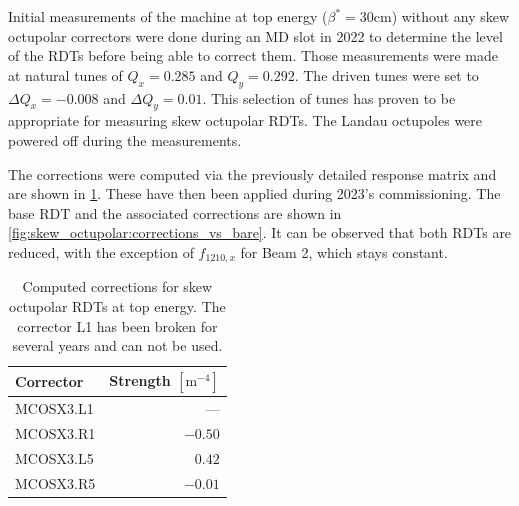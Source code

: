 
Initial measurements of the machine at top energy ($\beta^*=30$cm) without any skew octupolar
correctors were done during an MD slot in 2022 to determine the level of the RDTs before being able
to correct them. Those measurements were made at natural tunes of $Q_x = 0.285$ and $Q_y = 0.292$.
The driven tunes were set to $\Delta Q_x = -0.008$ and $\Delta Q_y = 0.01$. This selection of tunes
has proven to be appropriate for measuring skew octupolar RDTs. The Landau octupoles were powered
off during the measurements. 

The corrections were computed via the previously detailed response matrix and are shown in
\cref{tab:skew_octupolar:correction_strengths}. These have then been applied during 2023's
commissioning. The base RDT and the associated corrections are shown in
\cref{fig:skew_octupolar:corrections_vs_bare}. It can be observed that both RDTs are reduced, with
the exception of $f_{1210,x}$ for Beam 2, which stays constant.


\begin{table}[!htb]
    \centering
    \begin{tabular}{lr}
      \toprule
      Corrector    &    Strength $[\text{m}^{-4}]$ \\
      \midrule
      MCOSX3.L1    &                —  \\
      MCOSX3.R1    &           $-0.50$ \\
      MCOSX3.L5    &           $ 0.42$ \\
      MCOSX3.R5    &           $-0.01$ \\
      \bottomrule
    \end{tabular}
    \caption{Computed corrections for skew octupolar RDTs at top energy. The corrector L1 has been 
    broken for several years and can not be used.}
    \label{tab:skew_octupolar:correction_strengths}
\end{table}
 
